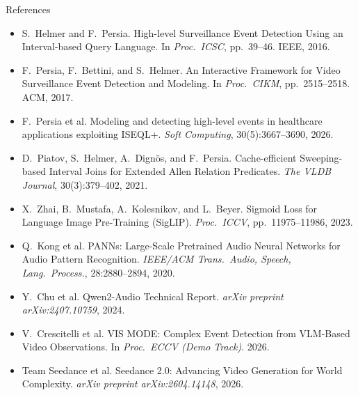 \documentclass[aspectratio=169,10pt]{beamer}
\begin{document}
\begin{frame}{References}
\footnotesize
\begin{itemize}
\setlength{\itemsep}{0.3em}

\item S.~Helmer and F.~Persia. High-level Surveillance Event Detection Using an Interval-based Query Language. In \emph{Proc.\ ICSC}, pp.\ 39--46. IEEE, 2016.

\item F.~Persia, F.~Bettini, and S.~Helmer. An Interactive Framework for Video Surveillance Event Detection and Modeling. In \emph{Proc.\ CIKM}, pp.\ 2515--2518. ACM, 2017.

\item F.~Persia et al. Modeling and detecting high-level events in healthcare applications exploiting ISEQL+. \emph{Soft Computing}, 30(5):3667--3690, 2026.

\item D.~Piatov, S.~Helmer, A.~Dign\"os, and F.~Persia. Cache-efficient Sweeping-based Interval Joins for Extended Allen Relation Predicates. \emph{The VLDB Journal}, 30(3):379--402, 2021.

\item X.~Zhai, B.~Mustafa, A.~Kolesnikov, and L.~Beyer. Sigmoid Loss for Language Image Pre-Training (SigLIP). \emph{Proc.\ ICCV}, pp.\ 11975--11986, 2023.

\item Q.~Kong et al. {PANNs}: Large-Scale Pretrained Audio Neural Networks for Audio Pattern Recognition. \emph{IEEE/ACM Trans.\ Audio, Speech, Lang.\ Process.}, 28:2880--2894, 2020.

\item Y.~Chu et al. Qwen2-Audio Technical Report. \emph{arXiv preprint arXiv:2407.10759}, 2024.

\item V.~Crescitelli et al. {VIS MODE}: Complex Event Detection from VLM-Based Video Observations. In \emph{Proc.\ ECCV (Demo Track)}. 2026.

\item Team Seedance et al. Seedance 2.0: Advancing Video Generation for World Complexity. \emph{arXiv preprint arXiv:2604.14148}, 2026.

\end{itemize}
\end{frame}
\end{document}

